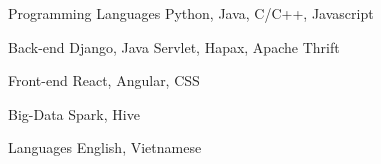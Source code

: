 

\begin{cvskills}

  \cvskill
    {Programming Languages} %
    {Python, Java, C/C++, Javascript} %

  \cvskill
    {Back-end} %
    {Django, Java Servlet, Hapax, Apache Thrift} %

  \cvskill
    {Front-end} %
    {React, Angular, CSS} %

  \cvskill
    {Big-Data} %
    {Spark, Hive} %

  \cvskill
    {Languages} %
    {English, Vietnamese} %

\end{cvskills}
